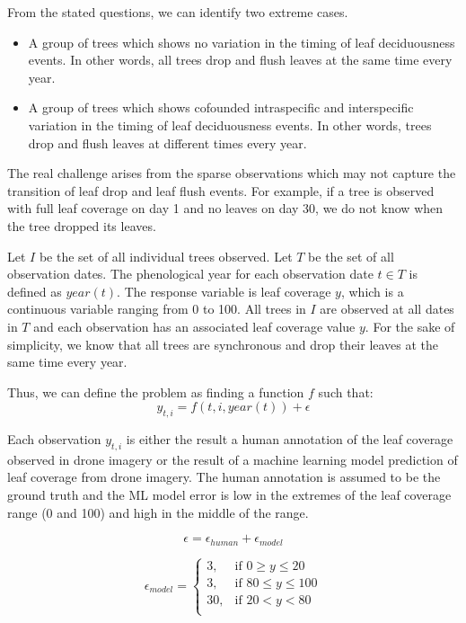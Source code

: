 \documentclass{article}
\begin{document}
From the stated questions, we can identify two extreme cases.
\begin{itemize}
    \item A group of trees which shows no variation in the timing of leaf deciduousness events. In other words, all trees drop and flush leaves at the same time every year.
    \item A group of trees which shows cofounded intraspecific and interspecific variation in the timing of leaf deciduousness events. In other words, trees drop and flush leaves at different times every year.
\end{itemize}

The real challenge arises from the sparse observations which may not capture the transition of leaf drop and leaf flush events.
For example, if a tree is observed with full leaf coverage on day 1 and no leaves on day 30, we do not know when the tree dropped its leaves.

Let $I$ be the set of all individual trees observed.
Let $T$ be the set of all observation dates.
The phenological year for each observation date $t \in T$ is defined as $year(t)$.
The response variable is leaf coverage $y$, which is a continuous variable ranging from 0 to 100.
All trees in $I$ are observed at all dates in $T$ and each observation has an associated leaf coverage value $y$.
For the sake of simplicity, we know that all trees are synchronous and drop their leaves at the same time every year.

Thus, we can define the problem as finding a function $f$ such that:
\begin{equation}
    y_{t, i} = f(t, i, year(t)) + \epsilon
\end{equation}

Each observation $y_{t, i}$ is either the result a human annotation of the leaf coverage observed in drone imagery or 
the result of a machine learning model prediction of leaf coverage from drone imagery.
The human annotation is assumed to be the ground truth and the ML model error is low in the extremes of the leaf coverage
 range (0 and 100) and high in the middle of the range.

\begin{equation}
    \epsilon = \epsilon_{human} + \epsilon_{model}
\end{equation}

\begin{equation}
    \epsilon_{model} =
    \begin{cases}
        3, & \text{if } 0 \geq y \leq 20 \\
        3, & \text{if } 80 \leq y \leq 100 \\
        30, & \text{if } 20 < y < 80\\
    \end{cases}
\end{equation}
\end{document}
